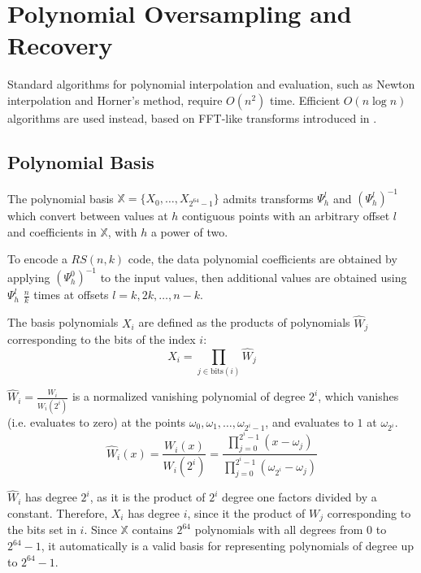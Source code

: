 \chapter{Polynomial Oversampling and Recovery}

Standard algorithms for polynomial interpolation and evaluation, such as Newton interpolation and Horner's method, require $O(n^2)$ time.
Efficient $O(n \log n)$ algorithms are used instead, based on FFT-like transforms introduced in \cite{novel-poly}.

\section{Polynomial Basis}

The polynomial basis $\mathbb{X} = \{X_0, \ldots, X_{2^{64} - 1}\}$ admits transforms $\Psi_h^l$ and $(\Psi_h^l)^{-1}$ which convert between values at $h$ contiguous points with an arbitrary offset $l$ and coefficients in $\mathbb{X}$, with $h$ a power of two.

To encode a $RS(n, k)$ code, the data polynomial coefficients are obtained by applying $(\Psi_h^0)^{-1}$ to the input values, then additional values are obtained using $\Psi_h^l$ $\frac{n}{k}$ times at offsets $l = k, 2k, \ldots, n - k$.

The basis polynomials $X_i$ are defined as the products of polynomials $\hat{W}_j$ corresponding to the bits of the index $i$:
\begin{equation}X_i = \prod_{j \in \text{bits}(i)} \hat{W}_j\end{equation}

$\hat{W}_i = \frac{W_i}{W_i(2^{i})}$ is a normalized vanishing polynomial of degree $2^{i}$, which vanishes (i.e. evaluates to zero) at the points $\omega_0, \omega_1, \ldots, \omega_{2^{i} - 1}$, and evaluates to $1$ at $\omega_{2^{i}}$.
\begin{equation}\hat{W}_i(x) = \frac{W_i(x)}{W_i(2^{i})} = \frac{\prod_{j = 0}^{2^i - 1} (x - \omega_j)}{\prod_{j = 0}^{2^i - 1} (\omega_{2^i} - \omega_j)}\end{equation}

$\hat{W}_i$ has degree $2^{i}$, as it is the product of $2^{i}$ degree one factors divided by a constant. Therefore, $X_i$ has degree $i$, since it the product of $W_j$ corresponding to the bits set in $i$.
Since $\mathbb{X}$ contains $2^{64}$ polynomials with all degrees from $0$ to $2^{64} - 1$, it automatically is a valid basis for representing polynomials of degree up to $2^{64} - 1$.

